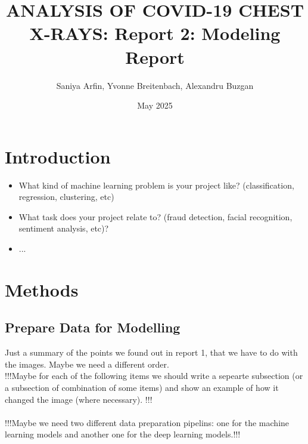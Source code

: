 \documentclass{article}
\title{ANALYSIS OF COVID-19 CHEST X-RAYS: Report 2: Modeling Report}
\author{Saniya Arfin, Yvonne Breitenbach, Alexandru Buzgan}
\date{May 2025}
\begin{document}
\maketitle

\tableofcontents

\newpage 

\section{Introduction}
\begin{itemize}
    \item What kind of machine learning problem is your project like? (classification, regression, clustering, etc)
    \item What task does your project relate to? (fraud detection, facial recognition, sentiment analysis, etc)?
    \item ...
\end{itemize}

\section{Methods}

\subsection{Prepare Data for Modelling}
Just a summary of the points we found out in report 1, that we have to do with the images. Maybe we need a different order.\\
!!!Maybe for each of the following items we should write a sepearte subsection (or a subsection of combination of some items) and show an example of how it changed the image (where necessary). !!!\\
\\
!!!Maybe we need two different data preparation pipelins: one for the machine learning models and another one for the deep learning models.!!!\\
\end{document}
